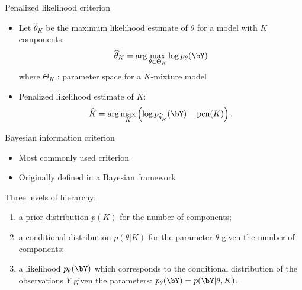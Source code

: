 \documentclass[compress,10pt]{beamer}
\begin{document}
\begin{frame}{Penalized likelihood criterion}


\begin{itemize}
 \item Let $\widehat{\theta}_K$ be the maximum likelihood estimate of $\theta$ for a model with $K$ components:
$$
\widehat{\theta}_K = \arg\max_{\theta \in \Theta_K} \log p_\theta(\bY)
$$
where $\Theta_K$ :  parameter space for a $K$-mixture model
\item \textcolor{dgreen}{Penalized likelihood estimate of $K$}: 
$$
\widehat{K} = \arg\max_K \left(\log p_{\widehat{\theta}_K}(\bY) - \text{pen}(K)\right).
$$ 
\end{itemize}
\end{frame}

\begin{frame}{Bayesian information criterion}

\begin{itemize}
 \item Most commonly used criterion \cite{Schwarz78}
 \item Originally defined in a Bayesian framework
\end{itemize}
Three levels of hierarchy:
\begin{enumerate}
 \item a prior distribution $p(K)$ for the number of components;
 \item a conditional distribution $p(\theta|K)$ for the parameter $\theta$ given the number of components;
 \item a likelihood $p_\theta(\bY)$ which corresponds to the conditional distribution of the observations $Y$ given the parameters: $p_\theta(\bY) = p(\bY | \theta, K)$.
\end{enumerate}
\end{frame}
\end{document}

